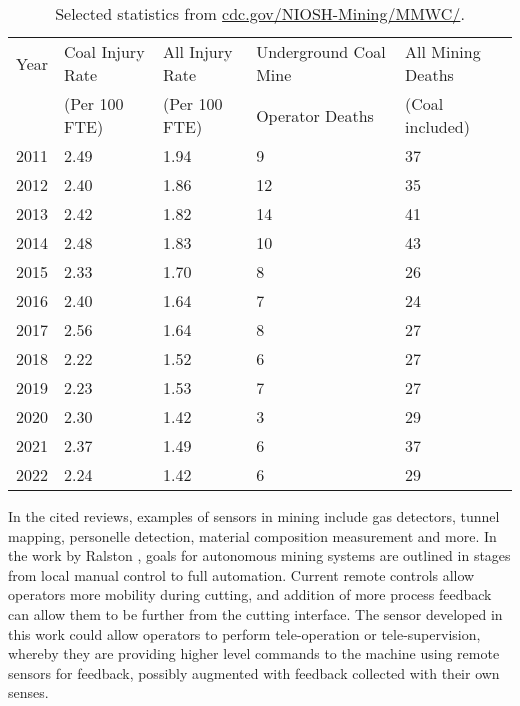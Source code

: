 \begin{table}[]
\centering
\caption{Selected statistics from \url{cdc.gov/NIOSH-Mining/MMWC/}.}
\label{tab:deaths}
\begin{tabular}{|l|l|l|l|l|}
\hline
Year & Coal Injury Rate & All Injury Rate & Underground Coal Mine & All Mining Deaths \\
     & (Per 100 FTE)    & (Per 100 FTE)   & Operator Deaths       & (Coal included)   \\ \hline
2011 & 2.49             & 1.94            & 9                     & 37                \\ \hline
2012 & 2.40             & 1.86            & 12                    & 35                \\ \hline
2013 & 2.42             & 1.82            & 14                    & 41                \\ \hline
2014 & 2.48             & 1.83            & 10                    & 43                \\ \hline
2015 & 2.33             & 1.70            & 8                     & 26                \\ \hline
2016 & 2.40             & 1.64            & 7                     & 24                \\ \hline
2017 & 2.56             & 1.64            & 8                     & 27                \\ \hline
2018 & 2.22             & 1.52            & 6                     & 27                \\ \hline
2019 & 2.23             & 1.53            & 7                     & 27                \\ \hline
2020 & 2.30             & 1.42            & 3                     & 29                \\ \hline
2021 & 2.37             & 1.49            & 6                     & 37                \\ \hline
2022 & 2.24             & 1.42            & 6                     & 29                \\ \hline
\end{tabular}
\end{table}

In the cited reviews, examples of sensors in mining include
gas detectors, tunnel mapping, personelle detection, material composition measurement and more.
In the work by Ralston \cite{RALSTON2014305}, goals for autonomous mining systems are outlined in stages
from local manual control to full automation.
Current remote controls allow operators more mobility during cutting, and addition of 
more process feedback can allow them to be further from the cutting interface.
The sensor developed in this work could allow operators to perform tele-operation or tele-supervision,
whereby they are providing higher level commands to the machine using remote sensors for feedback, 
possibly augmented with feedback collected with their own senses.

